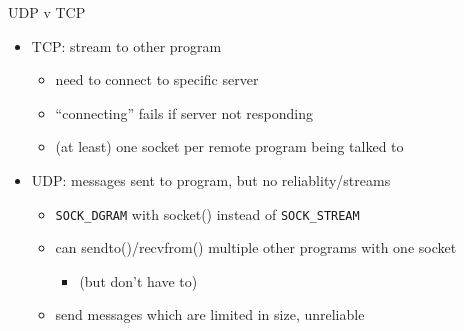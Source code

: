 \begin{frame}[fragile]{UDP v TCP}
    \begin{itemize}
    \item TCP: stream to other program
        \begin{itemize}
        \item need to connect to specific server
        \item ``connecting'' fails if server not responding
        \item (at least) one socket per remote program being talked to
        \end{itemize}
    \item UDP: messages sent to program, but no reliablity/streams
        \begin{itemize}
        \item \texttt{SOCK\_DGRAM} with socket() instead of \texttt{SOCK\_STREAM}
        \item can sendto()/recvfrom() multiple other programs with one socket
            \begin{itemize}
                \item (but don't have to)
            \end{itemize}
        \item send messages which are limited in size, unreliable
        \end{itemize}
    \end{itemize}
\end{frame}
